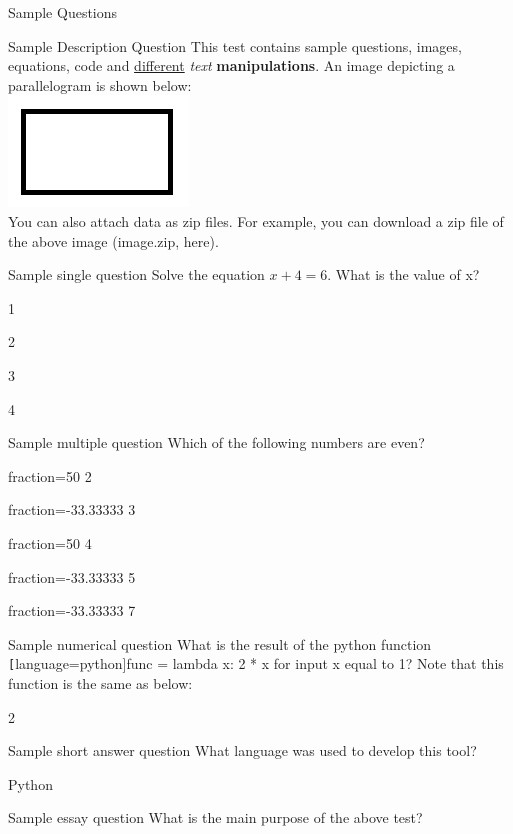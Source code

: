 \documentclass[12pt]{article}
\begin{document}
\begin{quiz}{Sample Questions}

\begin{description}{Sample Description Question}
This test contains sample questions, images, equations, code and \underline{different} \textit{text} \textbf{manipulations}. An image depicting a parallelogram is shown below:\\
\includegraphics{image.png}\\
You can also attach data as zip files. For example, you can download a zip file of the above image ({{image.zip, here}}).
\end{description}

\begin{singlechoice}{Sample single question}
Solve the equation ${x + 4 = 6}$. What is the value of x?
\item 1
\item* 2
\item 3
\item 4
\end{singlechoice}

\begin{multichoice}{Sample multiple question}
Which of the following numbers are even?
\item[fraction=50] 2
\item[fraction=-33.33333] 3
\item[fraction=50] 4
\item[fraction=-33.33333] 5
\item[fraction=-33.33333] 7
\end{multichoice}

\begin{numerical}{Sample numerical question}
What is the result of the python function \texttt[language=python]{func = lambda x: 2 * x} for input x equal to 1? Note that this function is the same as below:

\item 2
\end{numerical}

\begin{shortanswer}{Sample short answer question}
What language was used to develop this tool?
\item Python
\end{shortanswer}

\begin{essay}{Sample essay question}
What is the main purpose of the above test?
\end{essay}

\end{quiz}
\end{document}
